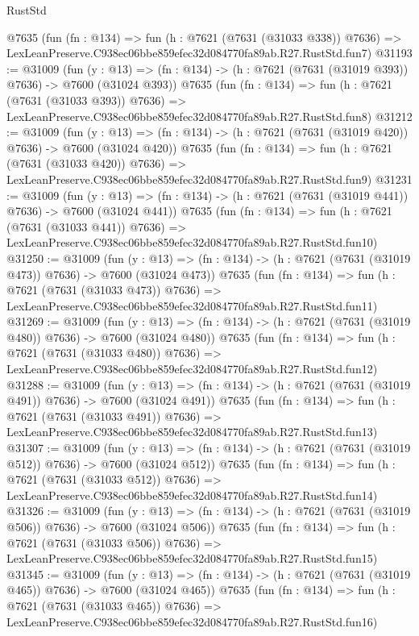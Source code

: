 \begin{lexlean}{RustStd}
\begin{coremodule}
    @7635
    (fun (fn : @134) =>
    fun (h : @7621 (@7631 (@31033 @338)) @7636) =>
    LexLeanPreserve.C938ec06bbe859efec32d084770fa89ab.R27.RustStd.fun7)
@31193 := @31009
    (fun (y : @13) => (fn : @134) -> (h : @7621 (@7631 (@31019 @393)) @7636) -> @7600 (@31024 @393))
    @7635
    (fun (fn : @134) =>
    fun (h : @7621 (@7631 (@31033 @393)) @7636) =>
    LexLeanPreserve.C938ec06bbe859efec32d084770fa89ab.R27.RustStd.fun8)
@31212 := @31009
    (fun (y : @13) => (fn : @134) -> (h : @7621 (@7631 (@31019 @420)) @7636) -> @7600 (@31024 @420))
    @7635
    (fun (fn : @134) =>
    fun (h : @7621 (@7631 (@31033 @420)) @7636) =>
    LexLeanPreserve.C938ec06bbe859efec32d084770fa89ab.R27.RustStd.fun9)
@31231 := @31009
    (fun (y : @13) => (fn : @134) -> (h : @7621 (@7631 (@31019 @441)) @7636) -> @7600 (@31024 @441))
    @7635
    (fun (fn : @134) =>
    fun (h : @7621 (@7631 (@31033 @441)) @7636) =>
    LexLeanPreserve.C938ec06bbe859efec32d084770fa89ab.R27.RustStd.fun10)
@31250 := @31009
    (fun (y : @13) => (fn : @134) -> (h : @7621 (@7631 (@31019 @473)) @7636) -> @7600 (@31024 @473))
    @7635
    (fun (fn : @134) =>
    fun (h : @7621 (@7631 (@31033 @473)) @7636) =>
    LexLeanPreserve.C938ec06bbe859efec32d084770fa89ab.R27.RustStd.fun11)
@31269 := @31009
    (fun (y : @13) => (fn : @134) -> (h : @7621 (@7631 (@31019 @480)) @7636) -> @7600 (@31024 @480))
    @7635
    (fun (fn : @134) =>
    fun (h : @7621 (@7631 (@31033 @480)) @7636) =>
    LexLeanPreserve.C938ec06bbe859efec32d084770fa89ab.R27.RustStd.fun12)
@31288 := @31009
    (fun (y : @13) => (fn : @134) -> (h : @7621 (@7631 (@31019 @491)) @7636) -> @7600 (@31024 @491))
    @7635
    (fun (fn : @134) =>
    fun (h : @7621 (@7631 (@31033 @491)) @7636) =>
    LexLeanPreserve.C938ec06bbe859efec32d084770fa89ab.R27.RustStd.fun13)
@31307 := @31009
    (fun (y : @13) => (fn : @134) -> (h : @7621 (@7631 (@31019 @512)) @7636) -> @7600 (@31024 @512))
    @7635
    (fun (fn : @134) =>
    fun (h : @7621 (@7631 (@31033 @512)) @7636) =>
    LexLeanPreserve.C938ec06bbe859efec32d084770fa89ab.R27.RustStd.fun14)
@31326 := @31009
    (fun (y : @13) => (fn : @134) -> (h : @7621 (@7631 (@31019 @506)) @7636) -> @7600 (@31024 @506))
    @7635
    (fun (fn : @134) =>
    fun (h : @7621 (@7631 (@31033 @506)) @7636) =>
    LexLeanPreserve.C938ec06bbe859efec32d084770fa89ab.R27.RustStd.fun15)
@31345 := @31009
    (fun (y : @13) => (fn : @134) -> (h : @7621 (@7631 (@31019 @465)) @7636) -> @7600 (@31024 @465))
    @7635
    (fun (fn : @134) =>
    fun (h : @7621 (@7631 (@31033 @465)) @7636) =>
    LexLeanPreserve.C938ec06bbe859efec32d084770fa89ab.R27.RustStd.fun16)

\end{coremodule}
\end{lexlean}
